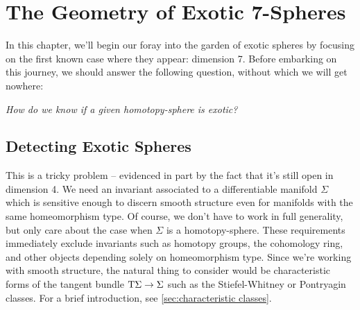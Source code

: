 \chapter{The Geometry of Exotic 7-Spheres}


In this chapter, we'll begin our foray into the garden of exotic spheres by focusing on the first known case where they appear: dimension 7. Before embarking on this journey, we should answer the following question, without which we will get nowhere:
\begin{center}
  \textsl{How do we know if a given homotopy-sphere is exotic?}
\end{center}

\section{Detecting Exotic Spheres}

This is a tricky problem -- evidenced in part by the fact that it's still open in dimension 4. We need an invariant associated to a differentiable manifold $\Sigma$ which is sensitive enough to discern smooth structure even for manifolds with the same homeomorphism type. Of course, we don't have to work in full generality, but only care about the case when $\Sigma$ is a homotopy-sphere. These requirements immediately exclude invariants such as homotopy groups, the cohomology ring, and other objects depending solely on homeomorphism type. Since we're working with smooth structure, the natural thing to consider would be characteristic forms of the tangent bundle $\mathrm{T} \Sigma \to \Sigma$ such as the Stiefel-Whitney or Pontryagin classes. For a brief introduction, see \cref{sec:characteristic classes}.

